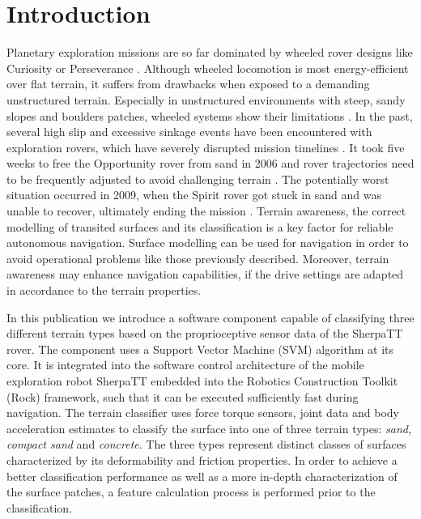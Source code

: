 \section{Introduction}

Planetary exploration missions are so far dominated by wheeled rover designs like Curiosity
or Perseverance \citep{moeller2021, welch2013}. Although wheeled locomotion is most energy-efficient
over flat terrain, it suffers from drawbacks when exposed to a demanding unstructured
terrain. Especially in unstructured environments with steep, sandy slopes and boulders
patches, wheeled systems show their limitations \citep{kolvenbach2021}. In the past, several high slip and
excessive sinkage events have been encountered with exploration rovers, which have severely
disrupted mission timelines \citep{gonzalez2018}. It took five weeks to free the Opportunity
rover from sand in 2006 \citep{young2006} and rover trajectories need to be frequently adjusted to avoid
challenging terrain \citep{arvidson2017}. The potentially worst situation occurred in 2009, when the
Spirit rover got stuck in sand and was unable to recover, ultimately ending the mission
\citep{webster2009}. 
Terrain awareness, the correct modelling of transited surfaces and its classification is a key factor for reliable autonomous navigation. 
Surface modelling can be used for navigation in order to avoid operational problems like those previously described. 
Moreover, terrain awareness may enhance navigation capabilities, if the drive settings are adapted in accordance to the 
terrain properties.

In this publication we introduce a software component capable of classifying three different terrain types based on the proprioceptive sensor data of the SherpaTT rover. 
The component uses a Support Vector Machine (SVM) algorithm \citep{vapnik1992,cristianini2000} at its core. It is integrated into the software control architecture of the mobile exploration robot SherpaTT embedded into the Robotics Construction Toolkit (Rock) framework, such that it can be executed sufficiently fast during navigation. The terrain classifier uses force torque sensors, joint data and body acceleration estimates to classify the surface into one of three terrain types: \emph{sand, compact sand} and \emph{concrete}.
The three types represent distinct classes of surfaces characterized by its deformability and friction properties. In order to achieve a better classification performance as well as a more in-depth characterization of the surface patches, a feature calculation process is performed prior to the classification. 

